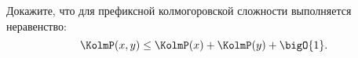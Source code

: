 Докажите, что для префиксной колмогоровской сложности выполняется неравенство:
$$\KolmP(x,y) \le \KolmP(x) + \KolmP(y) + \bigO{1}.$$
